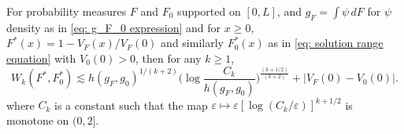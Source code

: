 \begin{lemma}\label{III.lemma: wasserstein bound}
For probability measures $F$ and $F_0$ supported on $[0, L]$, and $g_{\scriptscriptstyle{F}}= \int \psi \, dF$ for $\psi$ density as in \eqref{eq: g_F_0 expression} and for $x \geq 0$, $F^*(x) = 1 - V_{\scriptscriptstyle{F}}(x) / V_{\scriptscriptstyle{F}}(0)$ and similarly $F^*_0(x)$ as in \eqref{eq: solution range equation} with $V_0(0)>0$, then for any $k \geq 1$,
$$
W_k\left(F^*, F^*_0 \right) \lesssim h\left(g_{\scriptscriptstyle{F}}, g_0\right)^{1 /(k+2)}\bigg(\log \frac{C_k}{h\left(g_{\scriptscriptstyle{F}}, g_0\right)}\bigg)^{\frac{(k+1/2)}{(k+2)}} + |V_{\scriptscriptstyle{F}}(0) - V_0(0)|.
$$
where $C_k$ is a constant such that the map $\varepsilon \mapsto \varepsilon\left[\log \left(C_k / \varepsilon\right)\right]^{k+1 / 2}$ is monotone on $(0,2]$.
\end{lemma}
